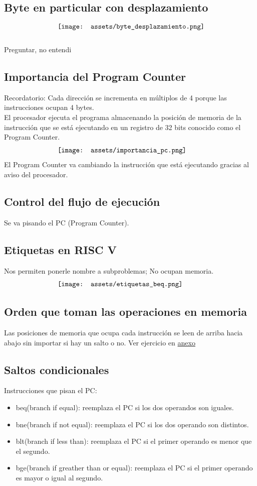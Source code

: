 \documentclass[10pt,a4paper]{article}
\begin{document}
\subsection*{Byte en particular con desplazamiento}
\[\begin{minipage}[b]{0.6\textwidth}
    \texttt{[image: assets/byte\_desplazamiento.png]}
    \label{fig:byte_desplazamiento}
\end{minipage}\] 
Preguntar, no entendi
\newpage 
\subsection*{Importancia del Program Counter}
Recordatorio: Cada dirección se incrementa en múltiplos de 4 porque las instrucciones ocupan 4 bytes. \\
El procesador ejecuta el programa almacenando la posición de memoria de la instrucción que se está ejecutando en un registro de 32 bits conocido como el Program Counter.
\[\begin{minipage}[b]{0.6\textwidth}
    \texttt{[image: assets/importancia\_pc.png]}
    \label{fig:importancia_pc}
\end{minipage}\] 
El Program Counter va cambiando la instrucción que está ejecutando gracias al aviso del procesador.
\subsection*{Control del flujo de ejecución}
Se va pisando el PC (Program Counter). 

\subsection*{Etiquetas en RISC V}
Nos permiten ponerle nombre a subproblemas; No ocupan memoria.
\[\begin{minipage}[b]{0.6\textwidth}
    \texttt{[image: assets/etiquetas\_beq.png]}
    \label{fig:etiquetas_beq}
\end{minipage}\] 

\subsection*{Orden que toman las operaciones en memoria}
Las posiciones de memoria que ocupa cada instrucción se leen de arriba hacia abajo sin importar si hay un salto o no.
Ver ejercicio en \hyperref[subsec:TPRVC]{anexo} 
\subsection*{Saltos condicionales}
Instrucciones que pisan el PC: 
\begin{itemize}
    \item beq(branch if equal): reemplaza el PC si los dos operandos son iguales.
    \item bne(branch if not equal): reemplaza el PC si los dos operando son distintos.
    \item blt(branch if less than): reemplaza el PC si el primer operando es menor que el segundo.
    \item bge(branch if greather than or equal): reemplaza el PC si el primer operando es mayor o igual al segundo.
\end{itemize}
\end{document}

